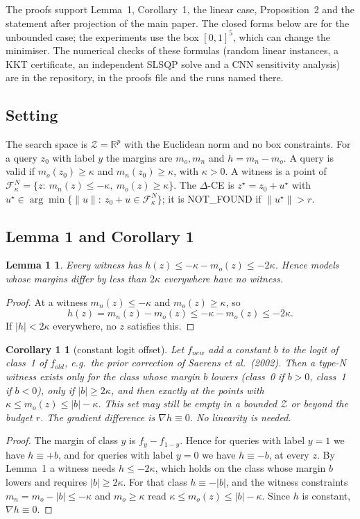 \documentclass[10pt,a4paper]{article}
\newtheorem*{lemmaone}{Lemma 1}
\newtheorem*{corone}{Corollary 1}
\theoremstyle{remark}
\newcommand{\F}{\mathcal F^N_\kappa}
\newcommand{\Z}{\mathcal Z}
\newcommand{\norm}[1]{\lVert #1\rVert}
\newcommand{\DCE}{$\Delta$-CE}
\begin{document}
The proofs support Lemma~1, Corollary~1, the linear case, Proposition~2 and the statement after projection of the main paper. The closed forms below are for the unbounded case; the experiments use the box $[0,1]^5$, which can change the minimiser. The numerical checks of these formulas (random linear instances, a KKT certificate, an independent SLSQP solve and a CNN sensitivity analysis) are in the repository, in the proofs file and the runs named there.

\subsection{Setting}

The search space is $\Z=\mathbb R^p$ with the Euclidean norm and no box constraints. For a query $z_0$ with label $y$ the margins are $m_o,m_n$ and $h=m_n-m_o$. A query is valid if $m_o(z_0)\ge\kappa$ and $m_n(z_0)\ge\kappa$, with $\kappa>0$. A witness is a point of $\F=\{z:\ m_n(z)\le-\kappa,\ m_o(z)\ge\kappa\}$. The \DCE{} is $z^\star=z_0+u^\star$ with $u^\star\in\arg\min\{\norm u:\ z_0+u\in\F\}$; it is NOT\_FOUND if $\norm{u^\star}>r$.

\subsection{Lemma 1 and Corollary 1}

\begin{lemmaone}
Every witness has $h(z)\le-\kappa-m_o(z)\le-2\kappa$. Hence models whose margins differ by less than $2\kappa$ everywhere have no witness.
\end{lemmaone}
\begin{proof}
At a witness $m_n(z)\le-\kappa$ and $m_o(z)\ge\kappa$, so
\[
h(z)=m_n(z)-m_o(z)\le-\kappa-m_o(z)\le-2\kappa .
\]
If $|h|<2\kappa$ everywhere, no $z$ satisfies this.
\end{proof}

\begin{corone}[constant logit offset]
Let $f_{new}$ add a constant $b$ to the logit of class~1 of $f_{old}$, e.g.\ the prior correction of Saerens et al.\ (2002). Then a type-N witness exists only for the class whose margin $b$ lowers (class~0 if $b>0$, class~1 if $b<0$), only if $|b|\ge2\kappa$, and then exactly at the points with $\kappa\le m_o(z)\le|b|-\kappa$. This set may still be empty in a bounded $\Z$ or beyond the budget $r$. The gradient difference is $\nabla h\equiv0$. No linearity is needed.
\end{corone}
\begin{proof}
The margin of class $y$ is $f_y-f_{1-y}$. Hence for queries with label $y=1$ we have $h\equiv+b$, and for queries with label $y=0$ we have $h\equiv-b$, at every $z$. By Lemma~1 a witness needs $h\le-2\kappa$, which holds on the class whose margin $b$ lowers and requires $|b|\ge2\kappa$. For that class $h\equiv-|b|$, and the witness constraints $m_n=m_o-|b|\le-\kappa$ and $m_o\ge\kappa$ read $\kappa\le m_o(z)\le|b|-\kappa$. Since $h$ is constant, $\nabla h\equiv0$.
\end{proof}
\end{document}
